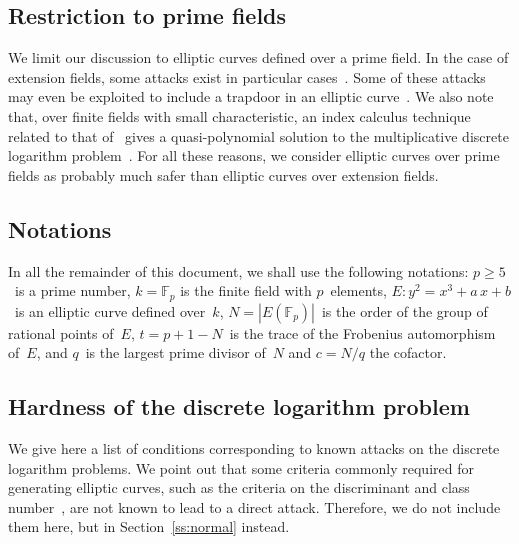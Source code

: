 \documentclass[twocolumn,letterpaper,10pt]{article}
\def\F{\mathbb{F}}
\def\abs#1{\left|#1\right|}
\def\XXX{{\colorbox{red}{{\color{white}\bfseries XXX}}}}
\begin{document}
\subsection*{Restriction to prime fields}
We limit our discussion to elliptic curves defined over a prime field.
In the case of extension fields,
some attacks exist in particular
cases~\cite{jc2013jv,rsa2004mtw,asia1999dgm,jc2002ghs}.
Some of these attacks may even be exploited
to include a trapdoor in an elliptic curve~\cite{jc2006teske}.
We also note that, over finite fields with small characteristic,
an index calculus technique related to that of~\cite{jc2013jv}
gives a quasi-polynomial solution to
the multiplicative discrete logarithm problem~\cite{euro2014bgjt}.
For all these reasons, we consider elliptic curves over prime fields
as probably much safer than elliptic curves over extension fields.



\subsection*{Notations}
In all the remainder of this document,
we shall use the following notations:
$p ≥ 5$~is a prime number,
$k = \F_{p}$ is the finite field with $p$~elements,
$E: y^2 = x^3 + a\,x + b$~is an elliptic curve defined over~$k$,
$N = \abs{E(\F_p)}$~is the order of the group of rational points of~$E$,
$t = p + 1 - N$~is the trace of the Frobenius automorphism of~$E$,
and $q$~is the largest prime divisor of~$N$ and $c = N/q$ the cofactor.

\subsection{Hardness of the discrete logarithm problem}
\label{ss:dlp}

We give here a list of conditions corresponding to
known attacks on the discrete logarithm problems.
We point out that some criteria commonly required
for generating elliptic curves,
such as the criteria on the discriminant and class number~\cite{rfc5639},
are not known to lead to a direct attack.
Therefore, we do not include them here,
but in Section~\ref{ss:normal} instead.
\end{document}
